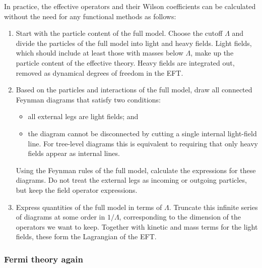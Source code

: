 In practice, the effective operators and their Wilson coefficients can
be calculated without the need for any functional methods as follows:
%
\begin{enumerate}
\item Start with the particle content of the full model. Choose the
  cutoff $\Lambda$ and divide the particles of the full model into
  light and heavy fields. Light fields, which should include at least
  those with masses below $\Lambda$, make up the particle content of
  the effective theory. Heavy fields are integrated out, \ie removed
  as dynamical degrees of freedom in the EFT.
%
\item Based on the particles and interactions of the full model, draw
  all connected Feynman diagrams that satisfy two conditions:
%
  \begin{itemize}
    \item all external legs are light fields; and
    \item the diagram cannot be disconnected by cutting a single
      internal light-field line. For tree-level diagrams this is
      equivalent to requiring that only heavy fields appear as
      internal lines.
  \end{itemize}
%
  Using the Feynman rules of the full model, calculate the expressions
  for these diagrams. Do not treat the external legs as incoming or
  outgoing particles, but keep the field operator expressions.
%
\item Express quantities of the full model in terms of
  $\Lambda$. Truncate this infinite series of diagrams at some order
  in $1/\Lambda$, corresponding to the dimension of the operators we
  want to keep. Together with kinetic and mass terms for the light
  fields, these form the Lagrangian of the EFT.
\end{enumerate}



  
\subsubsection{Fermi theory again}

